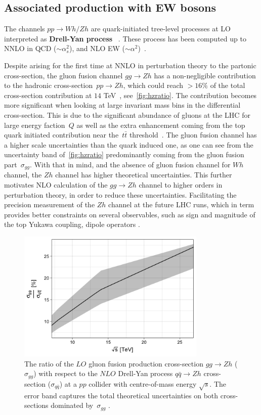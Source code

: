 \subsection{Associated production with EW bosons \label{vhproduction}}
The channels $pp\to Wh/Zh$ are  quark-initiated tree-level processes at LO interpreted as \textbf{Drell-Yan process}~ \cite{Han:1991ia,Brein:2003wg}. These process has been computed up to  NNLO in QCD ($\sim \alpha_s^2$), and  NLO  EW  ($\sim \alpha^2 $)~\cite{Amoroso:2020lgh}.
\par Despite arising for the first time at NNLO in perturbation theory to the partonic cross-section, the gluon fusion channel $g g \rightarrow Zh$ has a non-negligible contribution to the hadronic cross-section~$pp\to Zh$, which could reach $>16\%$ of the total cross-section contribution at $14$ TeV~\cite{Cepeda:2019klc}, see~\autoref{fig:hzratio}. The contribution becomes more significant when looking at large invariant mass bins in the differential cross-section. This is due to the significant abundance of gluons at the LHC for large energy faction~$Q$ as well as the extra enhancement coming from the top quark initiated contribution near the~$t\bar t$ threshold~\cite{Englert:2013vua}.  The gluon fusion channel has a higher scale uncertainties than the quark induced one, as one can see from the uncertainty band of~\autoref{fig:hzratio} predominantly coming from the gluon fusion part~$\sigma_{gg}$.  With that in mind, and the absence of gluon fusion channel for $Wh$ channel, the $Zh$ channel has higher theoretical uncertainties. This further motivates NLO calculation of the  $g g \rightarrow Z h$ channel to higher orders in perturbation theory,  in order to reduce these uncertainties. Facilitating the precision measurement of the $Zh$ channel at the future LHC runs, which in term provides better constraints on several observables, such as sign and magnitude of the top Yukawa coupling,  dipole operators \cite{Englert:2016hvy}.
\begin{figure}
	\begin{center}
		\includegraphics[width=9cm]{./figures/Rplot}
		\caption{The ratio of the $LO$ gluon fusion production cross-section $ gg \to Zh$  ($\sigma_{gg}$) with respect to the $NLO$ Drell-Yan process $ q\bar{q} \to Zh$ cross-section ($\sigma_{q\bar{q}}$) at a $pp$ collider with centre-of-mass energy $\sqrt{s}$. The error band captures the total theoretical uncertainties on both cross-sections dominated by~$\sigma_{gg}$ .}
		\label{fig:hzratio}
	\end{center}
\end{figure}
